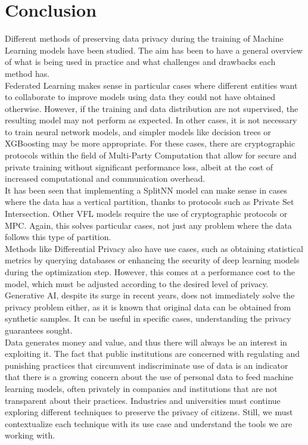 \chapter{Conclusion}

Different methods of preserving data privacy during the training of Machine Learning models have been studied. The aim has been to have a general overview of what is being used in practice and what challenges and drawbacks each method has.\\
Federated Learning makes sense in particular cases where different entities want to collaborate to improve models using data they could not have obtained otherwise. However, if the training and data distribution are not supervised, the resulting model may not perform as expected. In other cases, it is not necessary to train neural network models, and simpler models like decision trees or XGBoosting may be more appropriate. For these cases, there are cryptographic protocols within the field of Multi-Party Computation that allow for secure and private training without significant performance loss, albeit at the cost of increased computational and communication overhead.\\
It has been seen that implementing a SplitNN model can make sense in cases where the data has a vertical partition, thanks to protocols such as Private Set Intersection. Other VFL models require the use of cryptographic protocols or MPC. Again, this solves particular cases, not just any problem where the data follows this type of partition.\\
Methods like Differential Privacy also have use cases, such as obtaining statistical metrics by querying databases or enhancing the security of deep learning models during the optimization step. However, this comes at a performance cost to the model, which must be adjusted according to the desired level of privacy. Generative AI, despite its surge in recent years, does not immediately solve the privacy problem either, as it is known that original data can be obtained from synthetic samples. It can be useful in specific cases, understanding the privacy guarantees sought.\\

Data generates money and value, and thus there will always be an interest in exploiting it. The fact that public institutions are concerned with regulating and punishing practices that circumvent indiscriminate use of data is an indicator that there is a growing concern about the use of personal data to feed machine learning models, often privately in companies and institutions that are not transparent about their practices. Industries and universities must continue exploring different techniques to preserve the privacy of citizens. Still, we must contextualize each technique with its use case and understand the tools we are working with.\\

